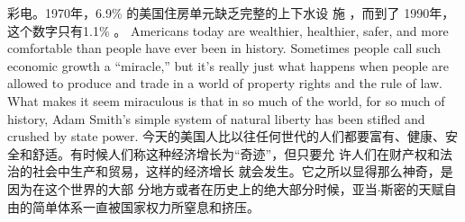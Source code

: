 \begin{paracol}{2}
彩电。1970年，6.9\% 的美国住房单元缺乏完整的上下水设
施 ，而到了 1990年，这个数字只有1.1\% 。
\switchcolumn*
Americans today are wealthier, healthier, safer, and more
comfortable than people have ever been in history. Sometimes
people call such economic growth a ``miracle,'' but it's really
just what happens when people are allowed to produce and
trade in a world of property rights and the rule of law. What
makes it seem miraculous is that in so much of the world, for so
much of history, Adam Smith's simple system of natural liberty
has been stifled and crushed by state power.
\switchcolumn
今天的美国人比以往任何世代的人们都要富有、健康、安
全和舒适。有时候人们称这种经济增长为“奇迹”，但只要允
许人们在财产权和法治的社会中生产和贸易，这样的经济增长
就会发生。它之所以显得那么神奇，是因为在这个世界的大部
分地方或者在历史上的绝大部分时候，亚当$\cdot$斯密的天赋自由的简单体系一直被国家权力所窒息和挤压。


\end{paracol}
